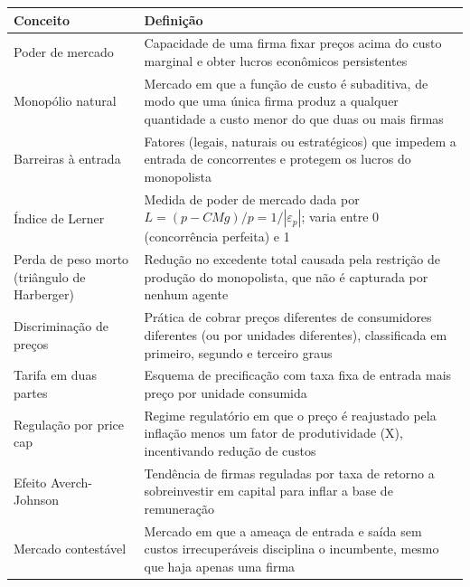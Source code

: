 \documentclass[11pt,twoside,openright]{book}
\begin{document}
{\def\LTcaptype{none} %
\begin{longtable}[]{@{}
  >{\raggedright\arraybackslash}p{}
  >{\raggedright\arraybackslash}p{}@{}}
\toprule\noalign{}
\begin{minipage}[b]{\linewidth}\raggedright
Conceito
\end{minipage} & \begin{minipage}[b]{\linewidth}\raggedright
Definição
\end{minipage} \\
\midrule\noalign{}
\endhead
\bottomrule\noalign{}
\endlastfoot
Poder de mercado & Capacidade de uma firma fixar preços acima do custo
marginal e obter lucros econômicos persistentes \\
Monopólio natural & Mercado em que a função de custo é subaditiva, de
modo que uma única firma produz a qualquer quantidade a custo menor do
que duas ou mais firmas \\
Barreiras à entrada & Fatores (legais, naturais ou estratégicos) que
impedem a entrada de concorrentes e protegem os lucros do monopolista \\
Índice de Lerner & Medida de poder de mercado dada por
\(L = (p - CMg)/p = 1/|\varepsilon_p|\); varia entre 0 (concorrência
perfeita) e 1 \\
Perda de peso morto (triângulo de Harberger) & Redução no excedente
total causada pela restrição de produção do monopolista, que não é
capturada por nenhum agente \\
Discriminação de preços & Prática de cobrar preços diferentes de
consumidores diferentes (ou por unidades diferentes), classificada em
primeiro, segundo e terceiro graus \\
Tarifa em duas partes & Esquema de precificação com taxa fixa de entrada
mais preço por unidade consumida \\
Regulação por price cap & Regime regulatório em que o preço é reajustado
pela inflação menos um fator de produtividade (X), incentivando redução
de custos \\
Efeito Averch-Johnson & Tendência de firmas reguladas por taxa de
retorno a sobreinvestir em capital para inflar a base de remuneração \\
Mercado contestável & Mercado em que a ameaça de entrada e saída sem
custos irrecuperáveis disciplina o incumbente, mesmo que haja apenas uma
firma \\
\end{longtable}
}
\end{document}
